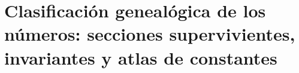 \chapter{Clasificación genealógica de los números: secciones supervivientes, invariantes y atlas de constantes}
\label{chap:p3-final:52:atlas_numero}




